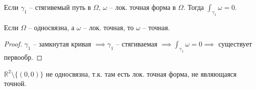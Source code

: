 \begin{consequence}
    Если $\gamma_1$ -- стягивемый путь в $\Omega$, $\omega$ -- лок. точная форма в $\Omega$. Тогда $\int_{\gamma_1} {\omega} = 0$.
\end{consequence}

\begin{theorem}
    Если $\Omega$ -- односвязна, а $\omega$ -- лок. точная, то $\omega$ -- точная.
\end{theorem}
\begin{proof}
    $\gamma_1$ -- замкнутая кривая $\implies \gamma_1$ -- стягиваемая $\implies \int_{\gamma_1} {\omega} = 0 \implies$ существует первообр.
\end{proof}

\begin{remark}
    $\mathbb{R}^2 \setminus \{ (0, 0) \}$ не односвязна, т.к. там есть лок. точная форма, не являющаяся точной.
\end{remark}

